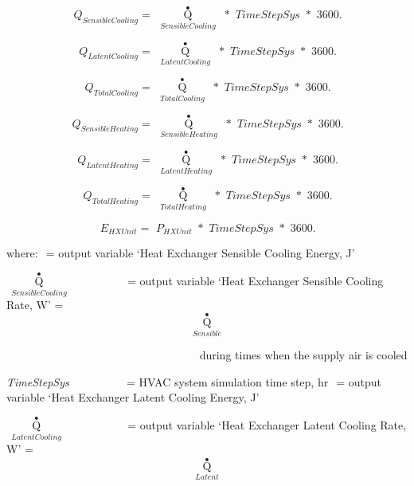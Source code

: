 \begin{equation}
\,{Q_{SensibleCooling}} = \,\,{\mathop Q\limits^ \bullet_{SensibleCooling}}\,\, * \,\,TimeStepSys\,\, * \,\,3600.
\end{equation}

\begin{equation}
\,{Q_{LatentCooling}} = \,\,{\mathop Q\limits^ \bullet_{LatentCooling}}\,\, * \,\,TimeStepSys\,\, * \,\,3600.
\end{equation}

\begin{equation}
\,{Q_{TotalCooling}} = \,\,{\mathop Q\limits^ \bullet_{TotalCooling}}\,\, * \,\,TimeStepSys\,\, * \,\,3600.
\end{equation}

\begin{equation}
\,{Q_{SensibleHeating}} = \,\,{\mathop Q\limits^ \bullet_{SensibleHeating}}\,\, * \,\,TimeStepSys\,\, * \,\,3600.
\end{equation}

\begin{equation}
\,{Q_{LatentHeating}} = \,\,{\mathop Q\limits^ \bullet_{LatentHeating}}\,\, * \,\,TimeStepSys\,\, * \,\,3600.
\end{equation}

\begin{equation}
\,{Q_{TotalHeating}} = \,\,{\mathop Q\limits^ \bullet_{TotalHeating}}\,\, * \,\,TimeStepSys\,\, * \,\,3600.
\end{equation}

\begin{equation}
\,{E_{HXUnit}} = \,\,{P_{HXUnit}}\,\, * \,\,TimeStepSys\,\, * \,\,3600.
\end{equation}

where: \(_{ }\) = output variable `Heat Exchanger Sensible Cooling Energy, J'

\(\,{\mathop Q\limits^ \bullet_{SensibleCooling}}\) ~~~~~~~~~ = output variable `Heat Exchanger Sensible Cooling Rate, W' = \[{\mathop Q\limits^ \bullet_{Sensible}}\]

~~~~~~~~~~~~~~~~~~~~~~~~~~~~~~~~~~ during times when the supply air is cooled

\emph{TimeStepSys} ~~~~~~~~~ = HVAC system simulation time step, hr \(_{ }\) = output variable `Heat Exchanger Latent Cooling Energy, J'

\(\,{\mathop Q\limits^ \bullet_{LatentCooling}}\) ~~~~~~~~~~ = output variable `Heat Exchanger Latent Cooling Rate, W' = \[{\mathop Q\limits^ \bullet_{Latent}}\]

